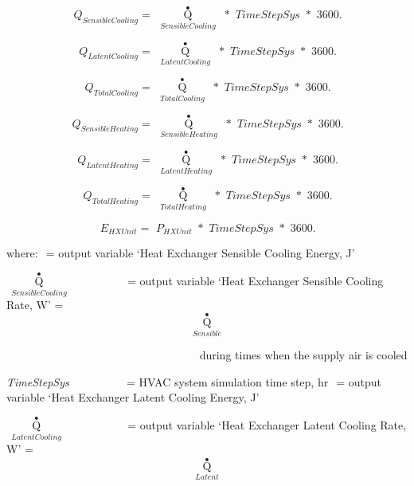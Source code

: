 \begin{equation}
\,{Q_{SensibleCooling}} = \,\,{\mathop Q\limits^ \bullet_{SensibleCooling}}\,\, * \,\,TimeStepSys\,\, * \,\,3600.
\end{equation}

\begin{equation}
\,{Q_{LatentCooling}} = \,\,{\mathop Q\limits^ \bullet_{LatentCooling}}\,\, * \,\,TimeStepSys\,\, * \,\,3600.
\end{equation}

\begin{equation}
\,{Q_{TotalCooling}} = \,\,{\mathop Q\limits^ \bullet_{TotalCooling}}\,\, * \,\,TimeStepSys\,\, * \,\,3600.
\end{equation}

\begin{equation}
\,{Q_{SensibleHeating}} = \,\,{\mathop Q\limits^ \bullet_{SensibleHeating}}\,\, * \,\,TimeStepSys\,\, * \,\,3600.
\end{equation}

\begin{equation}
\,{Q_{LatentHeating}} = \,\,{\mathop Q\limits^ \bullet_{LatentHeating}}\,\, * \,\,TimeStepSys\,\, * \,\,3600.
\end{equation}

\begin{equation}
\,{Q_{TotalHeating}} = \,\,{\mathop Q\limits^ \bullet_{TotalHeating}}\,\, * \,\,TimeStepSys\,\, * \,\,3600.
\end{equation}

\begin{equation}
\,{E_{HXUnit}} = \,\,{P_{HXUnit}}\,\, * \,\,TimeStepSys\,\, * \,\,3600.
\end{equation}

where: \(_{ }\) = output variable `Heat Exchanger Sensible Cooling Energy, J'

\(\,{\mathop Q\limits^ \bullet_{SensibleCooling}}\) ~~~~~~~~~ = output variable `Heat Exchanger Sensible Cooling Rate, W' = \[{\mathop Q\limits^ \bullet_{Sensible}}\]

~~~~~~~~~~~~~~~~~~~~~~~~~~~~~~~~~~ during times when the supply air is cooled

\emph{TimeStepSys} ~~~~~~~~~ = HVAC system simulation time step, hr \(_{ }\) = output variable `Heat Exchanger Latent Cooling Energy, J'

\(\,{\mathop Q\limits^ \bullet_{LatentCooling}}\) ~~~~~~~~~~ = output variable `Heat Exchanger Latent Cooling Rate, W' = \[{\mathop Q\limits^ \bullet_{Latent}}\]

